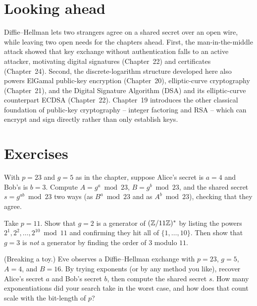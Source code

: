 \section{Looking ahead}
\label{ch18:ahead}

Diffie--Hellman lets two strangers agree on a shared secret over an open wire, while leaving two open needs for the chapters ahead. First, the man-in-the-middle attack showed that key exchange without authentication falls to an active attacker, motivating digital signatures (Chapter~22) and certificates (Chapter~24). Second, the discrete-logarithm structure developed here also powers ElGamal public-key encryption (Chapter~20), elliptic-curve cryptography (Chapter~21), and the Digital Signature Algorithm (DSA) and its elliptic-curve counterpart ECDSA (Chapter~22). Chapter~19 introduces the other classical foundation of public-key cryptography -- integer factoring and RSA -- which can encrypt and sign directly rather than only establish keys.

\section{Exercises}
\label{ch18:exercises}

\begin{exercise}
With $p = 23$ and $g = 5$ as in the chapter, suppose Alice's secret is $a = 4$ and Bob's is $b = 3$. Compute $A = g^a \bmod 23$, $B = g^b \bmod 23$, and the shared secret $s = g^{ab} \bmod 23$ two ways (as $B^a \bmod 23$ and as $A^b \bmod 23$), checking that they agree.
\end{exercise}

\begin{exercise}
Take $p = 11$. Show that $g = 2$ is a generator of $(\mathbb{Z}/11\mathbb{Z})^{*}$ by listing the powers $2^1, 2^2, \dots, 2^{10} \bmod 11$ and confirming they hit all of $\{1, \dots, 10\}$. Then show that $g = 3$ is \emph{not} a generator by finding the order of $3$ modulo $11$.
\end{exercise}

\begin{exercise}
(Breaking a toy.) Eve observes a Diffie--Hellman exchange with $p = 23$, $g = 5$, $A = 4$, and $B = 16$. By trying exponents (or by any method you like), recover Alice's secret $a$ and Bob's secret $b$, then compute the shared secret $s$. How many exponentiations did your search take in the worst case, and how does that count scale with the bit-length of $p$?
\end{exercise}

